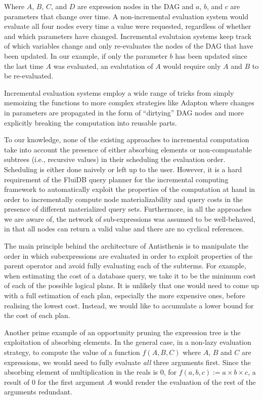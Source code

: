 Where \(A\), \(B\), \(C\), and \(D\) are expression nodes in the DAG
and \(a\), \(b\), and \(c\) are parameters that change over time. A
non-incremental evaluation system would evaluate all four nodes every
time a value were requested, regardless of whether and which
parameters have changed. Incremental evalutaion systems keep track of
which variables change and only re-evaluates the nodes of the DAG that
have been updated. In our example, if only the parameter \(b\) has been
updated since the last time \(A\) was evaluated, an evalutation of
\(A\) would require only \(A\) and \(B\) to be re-evaluated.

Incremental evaluation systems employ a wide range of tricks from
simply memoizing the functions
\cite{pughIncrementalComputationFunction1989} to more complex
strategies like Adapton
\cite{hammerAdaptonComposableDemanddriven2014a} where changes in
parameters are propagated in the form of ``dirtying'' DAG nodes and
more explicitly breaking the computation into reusable parts.

To our knowledge, none of the existing approaches to incremental
computation take into account the presence of either absorbing
elements or non-compuatable subtrees (i.e., recursive values) in their
scheduling the evaluation order. Scheduling is either done naively or
left up to the user. However, it is a hard requirement of the FluiDB
query planner for the incremental computing framework to automatically
exploit the properties of the computation at hand in order to
incrementally compute node materializability and query costs in the
presence of different materialized query sets. Furthermore, in all the
approaches we are aware of, the network of sub-expressions was assumed
to be well-behaved, in that all nodes can return a valid value and
there are no cyclical references.

The main principle behind the architecture of Antisthenis is to
manipulate the order in which subexpressions are evaluated in order
to exploit properties of the parent operator and avoid fully
evaluating each of the subterms. For example, when estimating the cost
of a database query, we take it to be the minimum cost of each of
the possible logical plans. It is unlikely that one would need to come
up with a full estimation of each plan, especially the more expensive
ones, before realising the lowest cost. Instead, we would like to
accumulate a lower bound for the cost of each plan.

Another prime example of an opportunity pruning the expression tree is
the exploitation of absorbing elements. In the general case, in a
non-lazy evaluation strategy, to compute the value of a function
\(f(A,B,C)\) where \(A\), \(B\) and \(C\) are expressions, we would
need to fully evaluate \emph{all} three arguments first. Since the
absorbing element of multiplication in the reals is 0, for
\(f(a,b,c) := a \times b \times c\), a result of 0 for the first
argument \(A\) would render the evaluation of the rest of the
arguments redundant.

